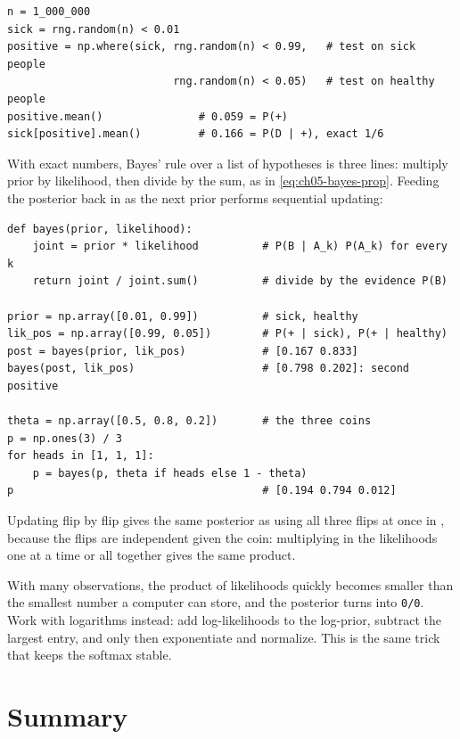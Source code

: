 \begin{lstlisting}
n = 1_000_000
sick = rng.random(n) < 0.01
positive = np.where(sick, rng.random(n) < 0.99,   # test on sick people
                          rng.random(n) < 0.05)   # test on healthy people
positive.mean()               # 0.059 = P(+)
sick[positive].mean()         # 0.166 = P(D | +), exact 1/6
\end{lstlisting}

With exact numbers, Bayes' rule over a list of hypotheses is three lines:
multiply prior by likelihood, then divide by the sum, as in
\cref{eq:ch05-bayes-prop}. Feeding the posterior back in as the next
prior performs sequential updating:

\begin{lstlisting}
def bayes(prior, likelihood):
    joint = prior * likelihood          # P(B | A_k) P(A_k) for every k
    return joint / joint.sum()          # divide by the evidence P(B)

prior = np.array([0.01, 0.99])          # sick, healthy
lik_pos = np.array([0.99, 0.05])        # P(+ | sick), P(+ | healthy)
post = bayes(prior, lik_pos)            # [0.167 0.833]
bayes(post, lik_pos)                    # [0.798 0.202]: second positive

theta = np.array([0.5, 0.8, 0.2])       # the three coins
p = np.ones(3) / 3
for heads in [1, 1, 1]:
    p = bayes(p, theta if heads else 1 - theta)
p                                       # [0.194 0.794 0.012]
\end{lstlisting}

Updating flip by flip gives the same posterior as using all three flips
at once in , because the flips are independent given
the coin: multiplying in the likelihoods one at a time or all together
gives the same product.

\begin{tip}
  With many observations, the product of likelihoods quickly becomes
  smaller than the smallest number a computer can store, and the
  posterior turns into \texttt{0/0}. Work with logarithms instead: add
  log-likelihoods to the log-prior, subtract the largest entry, and only
  then exponentiate and normalize. This is the same trick that keeps the
  softmax stable.
\end{tip}

\section{Summary}
\label{sec:ch05-summary}

